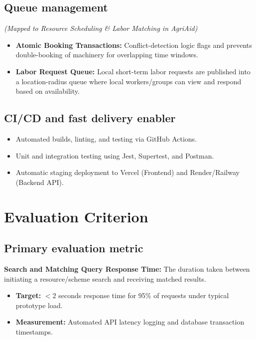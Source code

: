 \documentclass[11pt,a4paper]{article}
\begin{document}
\subsection{Queue management}
\textit{(Mapped to Resource Scheduling \& Labor Matching in AgriAid)}
\begin{itemize}[leftmargin=*]
    \item \textbf{Atomic Booking Transactions:} Conflict-detection logic flags and prevents double-booking of machinery for overlapping time windows.
    \item \textbf{Labor Request Queue:} Local short-term labor requests are published into a location-radius queue where local workers/groups can view and respond based on availability.
\end{itemize}

\subsection{CI/CD and fast delivery enabler}
\begin{itemize}[leftmargin=*]
    \item Automated builds, linting, and testing via GitHub Actions.
    \item Unit and integration testing using Jest, Supertest, and Postman.
    \item Automatic staging deployment to Vercel (Frontend) and Render/Railway (Backend API).
\end{itemize}

\section{Evaluation Criterion}

\subsection{Primary evaluation metric}
\textbf{Search and Matching Query Response Time:} The duration taken between initiating a resource/scheme search and receiving matched results.
\begin{itemize}[leftmargin=*]
    \item \textbf{Target:} $< 2$ seconds response time for 95\% of requests under typical prototype load.
    \item \textbf{Measurement:} Automated API latency logging and database transaction timestamps.
\end{itemize}
\end{document}
